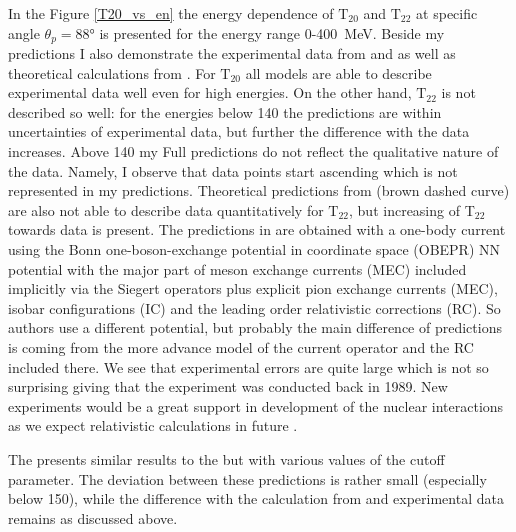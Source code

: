     In the Figure \ref{T20_vs_en} the energy dependence of $\text{T}_{20}$ and $\text{T}_{22}$
    at specific angle $\theta_p = \ang{88}$
    is presented for the energy range 0-400~MeV. Beside my predictions I also demonstrate the experimental data from
    \cite{rachek2007} and \cite{mishev1993} as well as theoretical calculations from \cite{Schmitt1989}.
    For $\text{T}_{20}$ all models are able to describe experimental data well even for
    high energies. On the other hand, $\text{T}_{22}$ is not described so well: for the 
    energies below \SI{140}{\mev} the predictions are within uncertainties of experimental data,
    but further the difference with the data increases. Above \SI{140}{\mev}
    my Full predictions do not  
    reflect the qualitative nature of the data. Namely, I observe that
    data points start ascending which is not represented in my predictions.
    Theoretical predictions from \cite{Schmitt1989} (brown dashed curve) are also not able
    to describe data quantitatively for $\text{T}_{22}$, but increasing of T$_{22}$
    towards data is present. The predictions in \cite{Schmitt1989}
    are obtained with a one-body current using the Bonn one-boson-exchange potential
    in coordinate space (OBEPR)
    NN potential with the major part of meson exchange
    currents (MEC) included implicitly via the Siegert operators plus explicit
    pion exchange currents (MEC), isobar configurations
    (IC) and the leading order relativistic corrections
    (RC). So authors use a different potential, but
    probably the main difference of predictions is coming from the
    more advance model of the current operator
    and the RC included there.
    We see that experimental errors are quite large which is not so surprising
    giving that the experiment was conducted back in 1989.
    New experiments would be a great support in development of the nuclear interactions
    as we expect relativistic calculations in future \cite{Grassi2023}.

    The  presents similar results to the  but
    with various values of the cutoff parameter. The deviation between these
    predictions is rather small (especially below \SI{150}{\mev}), while the
    difference with the calculation from \cite{Schmitt1989} and experimental 
    data remains as discussed above.

